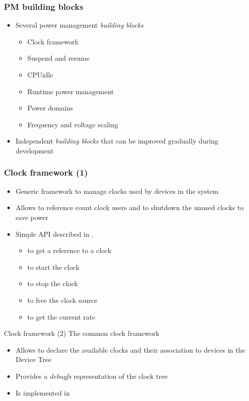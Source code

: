 \begin{frame}
  \frametitle{PM building blocks}
  \begin{itemize}
  \item Several power management \emph{building blocks}
    \begin{itemize}
    \item Clock framework
    \item Suspend and resume
    \item CPUidle
    \item Runtime power management
    \item Power domains
    \item Frequency and voltage scaling
    \end{itemize}
  \item Independent \emph{building blocks} that can be improved
    gradually during development
  \end{itemize}
\end{frame}

\begin{frame}
  \frametitle{Clock framework (1)}
  \begin{itemize}
  \item Generic framework to manage clocks used by devices in the
    system
  \item Allows to reference count clock users and to shutdown the
    unused clocks to save power
  \item Simple API described in .
    \begin{itemize}
    \item {} to get a reference to a clock
    \item {} to start the clock
    \item {} to stop the clock
    \item {} to free the clock source
    \item {} to get the current rate
    \end{itemize}
  \end{itemize}
\end{frame}


\begin{frame}{Clock framework (2)}
  The common clock framework
  \begin{itemize}
  \item Allows to declare the available clocks and their association
    to devices in the Device Tree
  \item Provides a {\em debugfs} representation of the clock tree
  \item Is implemented in 
  \end{itemize}
\end{frame}

